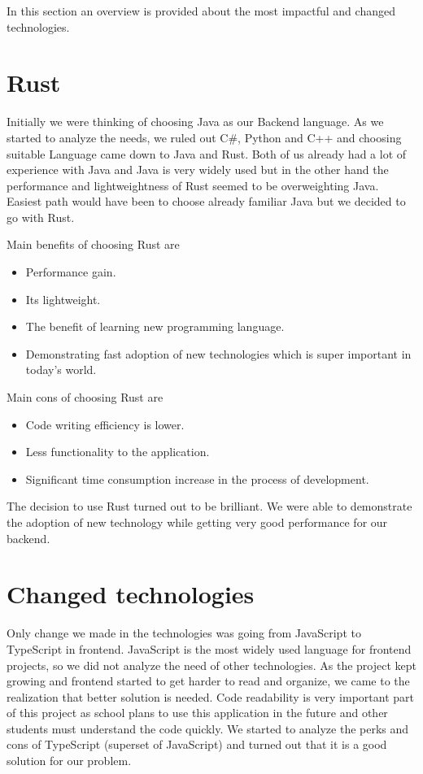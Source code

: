 In this section an overview is provided about the most impactful and changed technologies.

\section{Rust}\label{sec:rust}
Initially we were thinking of choosing Java as our Backend language.
As we started to analyze the needs, we ruled out C#, Python and C++ and choosing suitable Language came down to Java and Rust.
Both of us already had a lot of experience with Java and Java is very widely used but in the other hand the performance and lightweightness of Rust seemed to be overweighting Java.
Easiest path would have been to choose already familiar Java but we decided to go with Rust.

Main benefits of choosing Rust are
\begin{itemize}
    \item Performance gain.
    \item Its lightweight.
    \item The benefit of learning new programming language.
    \item Demonstrating fast adoption of new technologies which is super important in today's world.
\end{itemize}

Main cons of choosing Rust are
\begin{itemize}
    \item Code writing efficiency is lower.
    \item Less functionality to the application.
    \item Significant time consumption increase in the process of development.
\end{itemize}

The decision to use Rust turned out to be brilliant.
We were able to demonstrate the adoption of new technology while getting very good performance for our backend.

\section{Changed technologies}\label{sec:changed-technologies}
Only change we made in the technologies was going from JavaScript to TypeScript in frontend.
JavaScript is the most widely used language for frontend projects, so we did not analyze the need of other technologies.
As the project kept growing and frontend started to get harder to read and organize, we came to the realization that better solution is needed.
Code readability is very important part of this project as school plans to use this application in the future and other students must understand the code quickly.
We started to analyze the perks and cons of TypeScript (superset of JavaScript) and turned out that it is a good solution for our problem.

